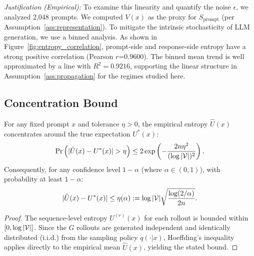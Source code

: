 \noindent\textit{{Justification (Empirical):}} To examine this linearity and quantify the noise $\epsilon$, we analyzed 2,048 prompts. We computed $V(x)$ as the proxy for $S_{\text{prompt}}$ (per Assumption~\ref{ass:representation}). %
To mitigate the intrinsic stochasticity of LLM generation, we use a binned analysis. As shown in Figure~\ref{fig:entropy_correlation}, prompt-side and response-side entropy have a strong positive correlation (Pearson $r$=0.9600). The binned mean trend is well approximated by a line with $R^2=0.9216$, supporting the linear structure in Assumption~\ref{ass:propagation} for the regimes studied here.

\subsection{Concentration Bound}
\begin{lemma}
\label{lemma:concentration}
For any fixed prompt $x$ and tolerance $\eta > 0$, the empirical entropy $\hat{U}(x)$ concentrates around the true expectation $U^*(x)$:
\begin{equation}
  \Pr\left(|\hat{U}(x) - U^*(x)| > \eta\right) \le 2 \exp\left( - \frac{2n\eta^2}{(\log|\mathcal{V}|)^2} \right).
  \label{eq:concentration_prob}
\end{equation}
Consequently, for any confidence level $1-\alpha$ (where $\alpha \in (0, 1)$), with probability at least $1-\alpha$:
\begin{equation}
  |\hat{U}(x) - U^*(x)| \le \eta(\alpha) := \log|\mathcal{V}| \sqrt{\frac{\log(2/\alpha)}{2n}}.
  \label{eq:concentration_bound}
\end{equation}
\end{lemma}

\begin{proof}
The sequence-level entropy $U^{(r)}(x)$ for each rollout is bounded within $[0, \log|\mathcal{V}|]$. Since the $G$ rollouts are generated independent and identically distributed (i.i.d.) from the sampling policy $q(\cdot|x)$, Hoeffding's inequality~\cite{hoeffding1963probability} applies directly to the empirical mean $\hat{U}(x)$, yielding the stated bound.
\end{proof}

